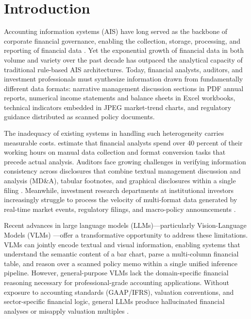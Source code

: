 \documentclass[12pt,letterpaper]{article}
\begin{document}
\newpage

\section{Introduction}
\label{sec:intro}

Accounting information systems (AIS) have long served as the backbone
of corporate financial governance, enabling the collection, storage,
processing, and reporting of financial data \citep{bodnar2013}.
Yet the exponential growth of financial data in both volume and variety
over the past decade has outpaced the analytical capacity of traditional
rule-based AIS architectures.
Today, financial analysts, auditors, and investment professionals must
synthesize information drawn from fundamentally different data formats:
narrative management discussion sections in PDF annual reports,
numerical income statements and balance sheets in Excel workbooks,
technical indicators embedded in JPEG market-trend charts,
and regulatory guidance distributed as scanned policy documents.

The inadequacy of existing systems in handling such heterogeneity carries
measurable costs.
\citet{cao2023} estimate that financial analysts spend over 40 percent
of their working hours on manual data collection and format conversion
tasks that precede actual analysis.
Auditors face growing challenges in verifying information consistency
across disclosures that combine textual management discussion and
analysis (MD\&A), tabular footnotes, and graphical disclosures within a
single filing \citep{sun2019}.
Meanwhile, investment research departments at institutional investors
increasingly struggle to process the velocity of multi-format data
generated by real-time market events, regulatory filings, and
macro-policy announcements \citep{lopezdeprado2023}.

Recent advances in large language models (LLMs)---particularly
Vision-Language Models (VLMs) \citep{radford2021,li2023}---offer
a transformative opportunity to address these limitations.
VLMs can jointly encode textual and visual information, enabling systems
that understand the semantic content of a bar chart, parse a
multi-column financial table, and reason over a scanned policy memo
within a single unified inference pipeline.
However, general-purpose VLMs lack the domain-specific financial
reasoning necessary for professional-grade accounting applications.
Without exposure to accounting standards (GAAP/IFRS), valuation
conventions, and sector-specific financial logic, general LLMs
produce hallucinated financial analyses or misapply valuation
multiples \citep{wu2023}.
\end{document}

